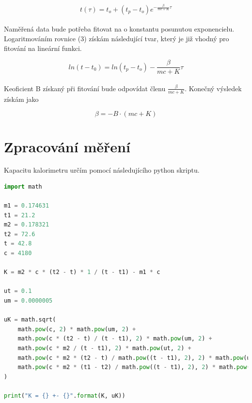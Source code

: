 \documentclass[a4paper,11pt]{article}
\begin{document}
        \begin{equation}
            t(\tau) = t_{o} + (t_{p} - t_{o}) e^{-\frac{\beta}{mc + K} \tau}
        \end{equation}

        \paragraph{} Naměřená data bude potřeba fitovat na o konstantu
        posunutou exponencielu. Logaritmováním rovnice (3) získám následující
        tvar, který je již vhodný pro fitování na lineární funkci.
        
        $$
            ln(t - t_0) = ln(t_p - t_o) - \frac{\beta}{mc + K} \tau
        $$

        \paragraph{} Keoficient B získaný při fitování bude odpovídat
        členu $\frac{\beta}{mc + K}$. Konečný výsledek získám jako

        $$
            \beta = - B \cdot (mc + K)
        $$

\section{Zpracování měření}

    \paragraph{} Kapacitu kalorimetru určím pomocí následujícího python
    skriptu.

    \begin{lstlisting}[language=Python]
import math

m1 = 0.174631
t1 = 21.2
m2 = 0.178321
t2 = 72.6
t = 42.8
c = 4180

K = m2 * c * (t2 - t) * 1 / (t - t1) - m1 * c

ut = 0.1
um = 0.0000005

uK = math.sqrt(
    math.pow(c, 2) * math.pow(um, 2) +
    math.pow(c * (t2 - t) / (t - t1), 2) * math.pow(um, 2) +
    math.pow(c * m2 / (t - t1), 2) * math.pow(ut, 2) +
    math.pow(c * m2 * (t2 - t) / math.pow((t - t1), 2), 2) * math.pow(ut, 2) +
    math.pow(c * m2 * (t1 - t2) / math.pow((t - t1), 2), 2) * math.pow(ut, 2)
)

print("K = {} +- {}".format(K, uK))\end{lstlisting}
\end{document}
